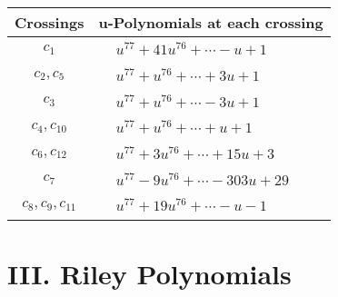 \documentclass[1p]{elsarticle_modified}
\theoremstyle{definition}
\begin{document}
\begin{tabular}{m{50pt}|m{274pt}}
Crossings & \hspace{64pt}u-Polynomials at each crossing \\
\hline $$\begin{aligned}c_{1}\end{aligned}$$&$\begin{aligned}
&u^{77}+41 u^{76}+\cdots- u+1
\end{aligned}$\\
\hline $$\begin{aligned}c_{2},c_{5}\end{aligned}$$&$\begin{aligned}
&u^{77}+u^{76}+\cdots+3 u+1
\end{aligned}$\\
\hline $$\begin{aligned}c_{3}\end{aligned}$$&$\begin{aligned}
&u^{77}+u^{76}+\cdots-3 u+1
\end{aligned}$\\
\hline $$\begin{aligned}c_{4},c_{10}\end{aligned}$$&$\begin{aligned}
&u^{77}+u^{76}+\cdots+u+1
\end{aligned}$\\
\hline $$\begin{aligned}c_{6},c_{12}\end{aligned}$$&$\begin{aligned}
&u^{77}+3 u^{76}+\cdots+15 u+3
\end{aligned}$\\
\hline $$\begin{aligned}c_{7}\end{aligned}$$&$\begin{aligned}
&u^{77}-9 u^{76}+\cdots-303 u+29
\end{aligned}$\\
\hline $$\begin{aligned}c_{8},c_{9},c_{11}\end{aligned}$$&$\begin{aligned}
&u^{77}+19 u^{76}+\cdots- u-1
\end{aligned}$\\
\hline
\end{tabular}\newpage\renewcommand{\arraystretch}{1}
\centering \section*{ III. Riley Polynomials}
\end{document}

